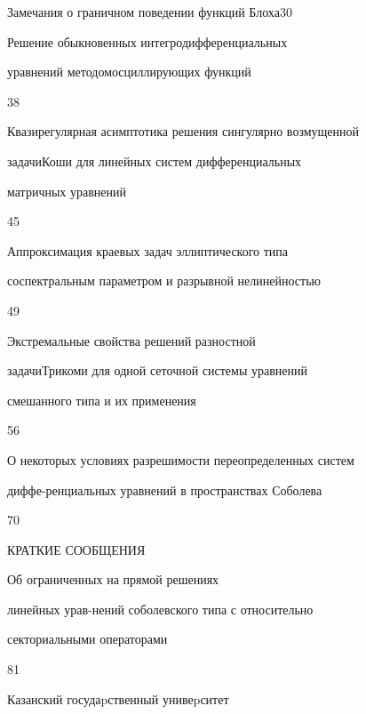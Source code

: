 

{Замечания о граничном поведении функций Блоха}{30}




{Решение обыкновенных интегродифференциальных


уравнений методом\newline осциллирующих функций}{38}




{Квазирегулярная асимптотика решения сингулярно возмущенной 


задачи\newline Коши для линейных систем дифференциальных 


матричных уравнений}{45}




{Аппроксимация краевых задач эллиптического типа


со\newline спектральным параметром и разрывной нелинейностью}{49}




{Экстремальные свойства решений разностной


задачи\newline Трикоми для одной сеточной системы уравнений


смешанного типа и их применения}{56}




{О некоторых условиях разрешимости переопределенных систем


диффе-\newline ренциальных уравнений в пространствах Соболева}{70}





\bigskip


\begin{center}


КРАТКИЕ СООБЩЕНИЯ


\end{center}







{Об ограниченных на прямой решениях


линейных урав-\newline нений соболевского типа с относительно


секториальными операторами}{81}








\vfill


\noindent\raisebox{2pt}{\copyright} Казанский госудаpственный унивеpситет





